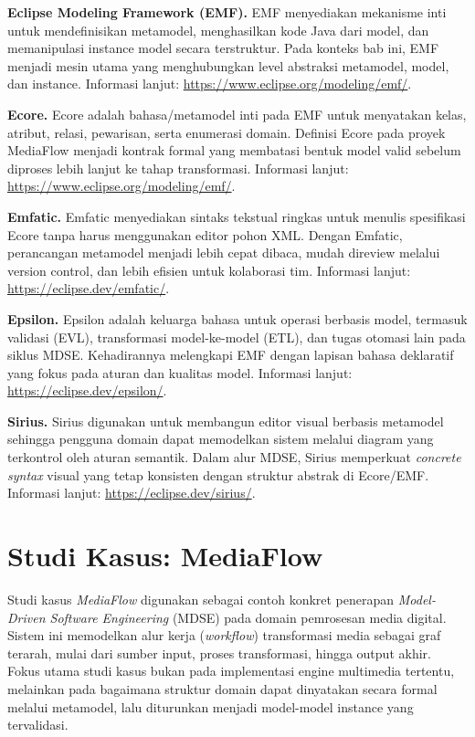 \textbf{Eclipse Modeling Framework (EMF).} EMF menyediakan mekanisme inti untuk mendefinisikan metamodel, menghasilkan kode Java dari model, dan memanipulasi instance model secara terstruktur. Pada konteks bab ini, EMF menjadi mesin utama yang menghubungkan level abstraksi metamodel, model, dan instance. Informasi lanjut: \url{https://www.eclipse.org/modeling/emf/}.

\textbf{Ecore.} Ecore adalah bahasa/metamodel inti pada EMF untuk menyatakan kelas, atribut, relasi, pewarisan, serta enumerasi domain. Definisi Ecore pada proyek MediaFlow menjadi kontrak formal yang membatasi bentuk model valid sebelum diproses lebih lanjut ke tahap transformasi. Informasi lanjut: \url{https://www.eclipse.org/modeling/emf/}.

\textbf{Emfatic.} Emfatic menyediakan sintaks tekstual ringkas untuk menulis spesifikasi Ecore tanpa harus menggunakan editor pohon XML. Dengan Emfatic, perancangan metamodel menjadi lebih cepat dibaca, mudah direview melalui version control, dan lebih efisien untuk kolaborasi tim. Informasi lanjut: \url{https://eclipse.dev/emfatic/}.

\textbf{Epsilon.} Epsilon adalah keluarga bahasa untuk operasi berbasis model, termasuk validasi (EVL), transformasi model-ke-model (ETL), dan tugas otomasi lain pada siklus MDSE. Kehadirannya melengkapi EMF dengan lapisan bahasa deklaratif yang fokus pada aturan dan kualitas model. Informasi lanjut: \url{https://eclipse.dev/epsilon/}.

\textbf{Sirius.} Sirius digunakan untuk membangun editor visual berbasis metamodel sehingga pengguna domain dapat memodelkan sistem melalui diagram yang terkontrol oleh aturan semantik. Dalam alur MDSE, Sirius memperkuat \textit{concrete syntax} visual yang tetap konsisten dengan struktur abstrak di Ecore/EMF. Informasi lanjut: \url{https://eclipse.dev/sirius/}.

\section{Studi Kasus: MediaFlow}
\label{sec:studi_kasus_mediaflow}

Studi kasus \textit{MediaFlow} digunakan sebagai contoh konkret penerapan \textit{Model-Driven Software Engineering} (MDSE) pada domain pemrosesan media digital. Sistem ini memodelkan alur kerja (\textit{workflow}) transformasi media sebagai graf terarah, mulai dari sumber input, proses transformasi, hingga output akhir. Fokus utama studi kasus bukan pada implementasi engine multimedia tertentu, melainkan pada bagaimana struktur domain dapat dinyatakan secara formal melalui metamodel, lalu diturunkan menjadi model-model instance yang tervalidasi.

